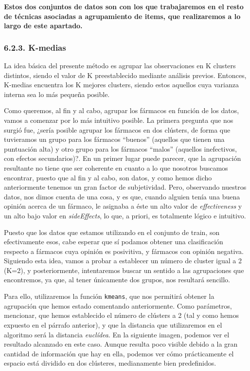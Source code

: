 \documentclass[spanish,]{article}
\begin{document}
\textbf{Estos dos conjuntos de datos son con los que trabajaremos en el
resto de técnicas asociadas a agrupamiento de items, que realizaremos a
lo largo de este apartado. }

\subsubsection{6.2.3. K-medias}\label{k-medias}

La idea básica del presente método es agrupar las observaciones en K
clusters distintos, siendo el valor de K preestablecido mediante
análisis previos. Entonces, K-medias encuentra los K mejores clusters,
siendo estos aquellos cuya varianza interna sea lo más pequeña posible.

Como queremos, al fin y al cabo, agrupar los fármacos en función de los
datos, vamos a comenzar por lo más intuitivo posible. La primera
pregunta que nos surgió fue, ¿sería posible agrupar los fármacos en dos
clústers, de forma que tuvieramos un grupo para los fármacos ``buenos''
(aquellos que tienen una puntuación alta) y otro grupo para los fármacos
``malos'' (aquellos inefectivos, con efectos secundarios)?. En un primer
lugar puede parecer, que la agrupación resultante no tiene que ser
coherente en cuanto a lo que nosotros buscamos encontrar, puesto que al
fin y al cabo, son datos, y como hemos dicho anteriormente tenemos un
gran factor de subjetividad. Pero, observando nuestros datos, nos dimos
cuenta de una cosa, y es que, cuando alguien tenía una buena opinión
acerca de un fármaco, le asignaba a éste un alto valor de
\emph{effectiveness} y un alto bajo valor en \emph{sideEffects}, lo que,
a priori, es totalmente lógico e intuitivo.

Puesto que los datos que estamos utilizando en el conjunto de train, son
efectivamente esos, cabe esperar que sí podamos obtener una
clasificación respecto a fármacos cuya opinión es posivitiva, y fármacos
con opinión negativa. Siguiendo esta idea, vamos a probar a establecer
un número de cluster igual a 2 (K=2), y posteriormente, intentaremos
buscar un sentido a las agrupaciones que encontremos, ya que, al tener
únicamente dos grupos, nos resultará sencillo.

Para ello, utilizaremos la función \texttt{kmeans}, que nos permitirá
obtener la agrupación que hemos estado comentando anteriormente. Como
parámetros, mencionar, que hemos establecido el número de clústers a 2
(tal y como hemos expuesto en el párrafo anterior), y que la distancia
que utilizaremos en el algoritmo será la distancia \emph{euclídea}. En
la siguiente imagen, podemos ver el resultado alcanzado en este caso.
Aunque resulta poco visible debido a la gran cantidad de información que
hay en ella, podemos ver cómo prácticamente el espacio está dividido en
dos clústeres, medianamente bien predefinidos.
\end{document}
